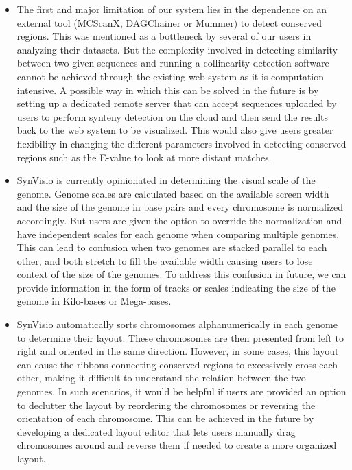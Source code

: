  \begin{itemize}
    \item The first and major limitation of our system lies in the dependence on an external tool (MCScanX, DAGChainer or Mummer) to detect conserved regions. This was mentioned as a bottleneck by several of our users in analyzing their datasets. But the complexity involved in detecting similarity between two given sequences and running a collinearity detection software cannot be achieved through the existing web system as it is computation intensive. A possible way in which this can be solved in the future is by setting up a dedicated remote server that can accept sequences uploaded by users to perform synteny detection on the cloud and then send the results back to the web system to be visualized. This would also give users greater flexibility in changing the different parameters involved in detecting conserved regions such as the E-value  to look at more distant matches.    
    
    \item SynVisio is currently opinionated in determining the visual scale of the genome. Genome scales are calculated based on the available screen width and the size of the genome in base pairs and every chromosome is normalized accordingly. But users are given the option to override the normalization and have independent scales for each genome when comparing multiple genomes. This can lead to confusion when two genomes are stacked parallel to each other, and both stretch to fill the available width causing users to lose context of the size of the genomes. To address this confusion in future, we can provide information in the form of tracks or scales indicating the size of the genome in Kilo-bases or Mega-bases.
    
    \item SynVisio automatically sorts chromosomes alphanumerically in each genome to determine their layout. These chromosomes are then presented from left to right and oriented in the same direction. However, in some cases, this layout can cause the ribbons connecting conserved regions to excessively cross each other, making it difficult to understand the relation between the two genomes. In such scenarios, it would be helpful if users are provided an option to declutter the layout by reordering the chromosomes or reversing the orientation of each chromosome. This can be achieved in the future by developing a dedicated layout editor that lets users manually drag chromosomes around and reverse them if needed to create a more organized layout.
    

\end{itemize}
